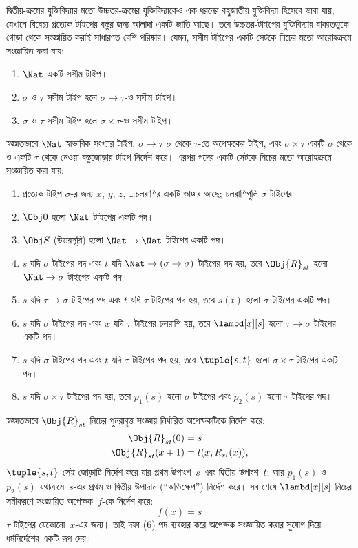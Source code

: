 \documentclass[../../../include/open-logic-section]{subfiles}
\begin{document}
দ্বিতীয়-ক্রমের যুক্তিবিদ্যার মতো উচ্চতর-ক্রমের যুক্তিবিদ্যাকেও এক
ধরনের বহুজাতীয় যুক্তিবিদ্যা হিসেবে ভাবা যায়, যেখানে বিবেচ্য প্রত্যেক
টাইপের বস্তুর জন্য আলাদা একটি জাতি আছে। তবে উচ্চতর-টাইপের যুক্তিবিদ্যার
বাক্যতত্ত্বকে গোড়া থেকে সংজ্ঞায়িত করাই সাধারণত বেশি পরিষ্কার। যেমন,
সসীম টাইপের একটি সেটকে নিচের মতো আরোহক্রমে সংজ্ঞায়িত করা যায়:
\begin{enumerate}
\item $\Nat$ একটি সসীম টাইপ।
\item $\sigma$ ও $\tau$ সসীম টাইপ হলে $\sigma \to \tau$-ও সসীম
  টাইপ।
\item $\sigma$ ও $\tau$ সসীম টাইপ হলে $\sigma \times \tau$-ও সসীম
  টাইপ।
\end{enumerate}
স্বজ্ঞাতভাবে $\Nat$ স্বাভাবিক সংখ্যার টাইপ, $\sigma \to \tau$
$\sigma$ থেকে $\tau$-তে অপেক্ষকের টাইপ, এবং $\sigma \times \tau$
একটি $\sigma$ থেকে ও একটি $\tau$ থেকে নেওয়া বস্তুজোড়ার টাইপ নির্দেশ
করে। এরপর পদের একটি সেটকে নিচের মতো আরোহক্রমে সংজ্ঞায়িত করা যায়:
\begin{enumerate}
\item প্রত্যেক টাইপ $\sigma$-র জন্য $x$, $y$, $z$, \dots চলরাশির
  একটি ভাণ্ডার আছে; চলরাশিগুলি $\sigma$ টাইপের।
\item $\Obj 0$ হলো $\Nat$ টাইপের একটি পদ।
\item $\Obj S$ (উত্তরসূরি) হলো $\Nat \to \Nat$ টাইপের একটি পদ।
\item $s$ যদি $\sigma$ টাইপের পদ এবং $t$ যদি $\Nat \to (\sigma
  \to \sigma)$ টাইপের পদ হয়, তবে $\Obj{R}_{st}$ হলো $\Nat \to
  \sigma$ টাইপের একটি পদ।
\item $s$ যদি $\tau \to \sigma$ টাইপের পদ এবং $t$ যদি $\tau$ টাইপের
  পদ হয়, তবে $s(t)$ হলো $\sigma$ টাইপের একটি পদ।
\item $s$ যদি $\sigma$ টাইপের পদ এবং $x$ যদি $\tau$ টাইপের চলরাশি
  হয়, তবে $\lambd[x][s]$ হলো $\tau \to \sigma$ টাইপের একটি পদ।
\item $s$ যদি $\sigma$ টাইপের পদ এবং $t$ যদি $\tau$ টাইপের পদ হয়,
  তবে $\tuple{s, t}$ হলো $\sigma \times \tau$ টাইপের একটি পদ।
\item $s$ যদি $\sigma \times \tau$ টাইপের পদ হয়, তবে $p_1(s)$
  হলো $\sigma$ টাইপের এবং $p_2(s)$ হলো $\tau$ টাইপের পদ।
\end{enumerate}
স্বজ্ঞাতভাবে $\Obj{R}_{st}$ নিচের পুনরাবৃত্ত সংজ্ঞায় নির্ধারিত
অপেক্ষকটিকে নির্দেশ করে:
\begin{align*}
\Obj{R}_{st}(0) & = s \\
\Obj{R}_{st}(x+1) & = t(x, R_{st}(x)),
\end{align*}
$\tuple{s, t}$ সেই জোড়াটি নির্দেশ করে যার প্রথম উপাংশ~$s$ এবং দ্বিতীয়
উপাংশ~$t$; আর $p_1(s)$ ও~$p_2(s)$ যথাক্রমে~$s$-এর প্রথম ও দ্বিতীয়
উপাদান (“অভিক্ষেপ”) নির্দেশ করে। সব শেষে $\lambd[x][s]$ নিচের
সমীকরণে সংজ্ঞায়িত অপেক্ষক~$f$-কে নির্দেশ করে:
\[
f(x) = s
\]
$\tau$ টাইপের যেকোনো~$x$-এর জন্য। তাই দফা (6) পদ ব্যবহার করে অপেক্ষক
সংজ্ঞায়িত করার সুযোগ দিয়ে ধর্মনির্দেশের একটি রূপ দেয়।
\end{document}
